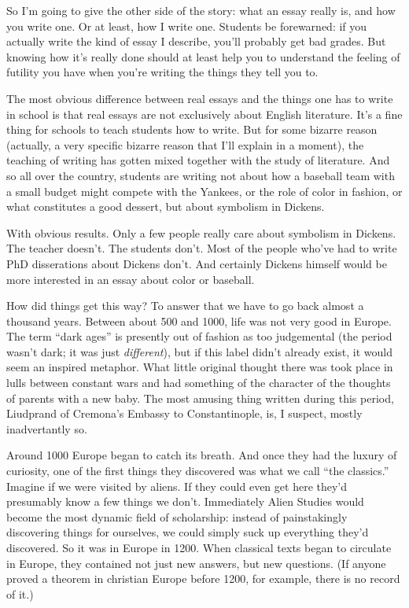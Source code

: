 So I'm going to give the other side of the story: what an essay really
is, and how you write one. Or at least, how I write one. Students be
forewarned: if you actually write the kind of essay I describe, you'll
probably get bad grades. But knowing how it's really done should at
least help you to understand the feeling of futility you have when
you're writing the things they tell you to.

The most obvious difference between real essays and the things one has
to write in school is that real essays are not exclusively about English
literature. It's a fine thing for schools to teach students how to
write. But for some bizarre reason (actually, a very specific bizarre
reason that I'll explain in a moment), the teaching of writing has
gotten mixed together with the study of literature. And so all over the
country, students are writing not about how a baseball team with a small
budget might compete with the Yankees, or the role of color in fashion,
or what constitutes a good dessert, but about symbolism in Dickens.

With obvious results. Only a few people really care about symbolism in
Dickens. The teacher doesn't. The students don't. Most of the people
who've had to write PhD disserations about Dickens don't. And certainly
Dickens himself would be more interested in an essay about color or
baseball.

How did things get this way? To answer that we have to go back almost a
thousand years. Between about 500 and 1000, life was not very good in
Europe. The term ``dark ages'' is presently out of fashion as too
judgemental (the period wasn't dark; it was just \emph{different}), but
if this label didn't already exist, it would seem an inspired metaphor.
What little original thought there was took place in lulls between
constant wars and had something of the character of the thoughts of
parents with a new baby. The most amusing thing written during this
period, Liudprand of Cremona's Embassy to Constantinople, is, I suspect,
mostly inadvertantly so.

Around 1000 Europe began to catch its breath. And once they had the
luxury of curiosity, one of the first things they discovered was what we
call ``the classics.'' Imagine if we were visited by aliens. If they
could even get here they'd presumably know a few things we don't.
Immediately Alien Studies would become the most dynamic field of
scholarship: instead of painstakingly discovering things for ourselves,
we could simply suck up everything they'd discovered. So it was in
Europe in 1200. When classical texts began to circulate in Europe, they
contained not just new answers, but new questions. (If anyone proved a
theorem in christian Europe before 1200, for example, there is no record
of it.)

